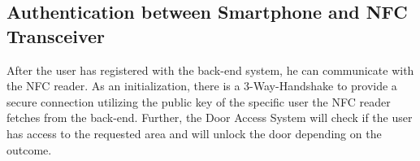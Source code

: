 \subsection{Authentication between Smartphone and NFC Transceiver}
After the user has registered with the back-end system, he can communicate with the NFC reader. As an initialization, there is a 3-Way-Handshake to provide a secure connection utilizing the public key of the specific user the NFC reader fetches from the back-end.
Further, the Door Access System will check if the user has access to the requested area and will unlock the door depending on the outcome.

